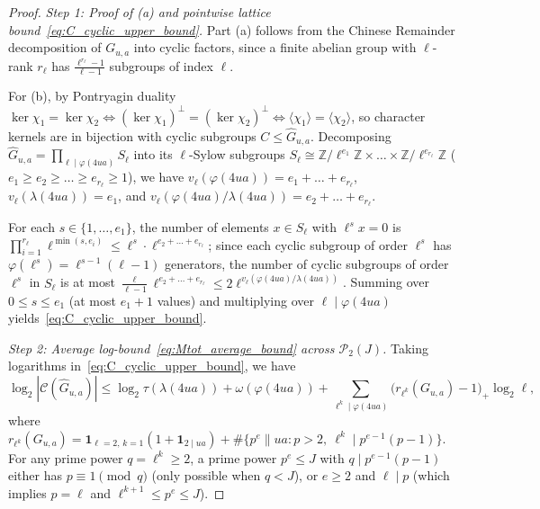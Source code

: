 \documentclass[11pt, a4paper]{article}
\theoremstyle{plain}
\theoremstyle{definition}
\newcommand{\Z}{\mathbb{Z}}
\begin{document}
\begin{proof}
\emph{Step 1: Proof of (a) and pointwise lattice bound~\eqref{eq:C_cyclic_upper_bound}.}
Part (a) follows from the Chinese Remainder decomposition of $G_{u,a}$ into cyclic factors, since a finite abelian group with $\ell$-rank $r_\ell$ has $\frac{\ell^{r_\ell}-1}{\ell-1}$ subgroups of index $\ell$. 

For (b), by Pontryagin duality $\ker\chi_1=\ker\chi_2\iff(\ker\chi_1)^{\perp}=(\ker\chi_2)^{\perp}\iff\langle\chi_1\rangle=\langle\chi_2\rangle$, so character kernels are in bijection with cyclic subgroups $C\le\widehat{G}_{u,a}$. Decomposing $\widehat{G}_{u,a}=\prod_{\ell\mid\varphi(4ua)}S_\ell$ into its $\ell$-Sylow subgroups $S_\ell\cong\Z/\ell^{e_1}\Z\times\dots\times\Z/\ell^{e_{r_\ell}}\Z$ ($e_1\ge e_2\ge\dots\ge e_{r_\ell}\ge1$), we have $v_\ell(\varphi(4ua))=e_1+\dots+e_{r_\ell}$, $v_\ell(\lambda(4ua))=e_1$, and $v_\ell(\varphi(4ua)/\lambda(4ua))=e_2+\dots+e_{r_\ell}$. 

For each $s\in\{1,\dots,e_1\}$, the number of elements $x\in S_\ell$ with $\ell^{s}x=0$ is $\prod_{i=1}^{r_\ell}\ell^{\min(s,e_i)}\le\ell^{s}\cdot\ell^{e_2+\dots+e_{r_\ell}}$; since each cyclic subgroup of order $\ell^{s}$ has $\varphi(\ell^{s})=\ell^{s-1}(\ell-1)$ generators, the number of cyclic subgroups of order $\ell^{s}$ in $S_\ell$ is at most $\frac{\ell}{\ell-1}\ell^{e_2+\dots+e_{r_\ell}}\le 2\ell^{v_\ell(\varphi(4ua)/\lambda(4ua))}$. Summing over $0\le s\le e_1$ (at most $e_1+1$ values) and multiplying over $\ell\mid\varphi(4ua)$ yields~\eqref{eq:C_cyclic_upper_bound}.

\medskip\noindent\emph{Step 2: Average log-bound~\eqref{eq:Mtot_average_bound} across $\mathcal{P}_2(J)$.}
Taking logarithms in~\eqref{eq:C_cyclic_upper_bound}, we have 
\[
\log_2|\mathcal{C}(\widehat{G}_{u,a})|\le\log_2\tau(\lambda(4ua))+\omega(\varphi(4ua))+\sum_{\ell^{k}\mid\varphi(4ua)}\big(r_{\ell^{k}}(G_{u,a})-1\big)_{+}\log_2\ell,
\]
where $r_{\ell^{k}}(G_{u,a})=\mathbf{1}_{\ell=2,\,k=1}(1+\mathbf{1}_{2\mid ua})+\#\{p^{e}\parallel ua:p>2,\ \ell^{k}\mid p^{e-1}(p-1)\}$. For any prime power $q=\ell^{k}\ge 2$, a prime power $p^{e}\le J$ with $q\mid p^{e-1}(p-1)$ either has $p\equiv 1\pmod q$ (only possible when $q<J$), or $e\ge 2$ and $\ell\mid p$ (which implies $p=\ell$ and $\ell^{k+1}\le p^{e}\le J$). 


\end{proof}
\end{document}
